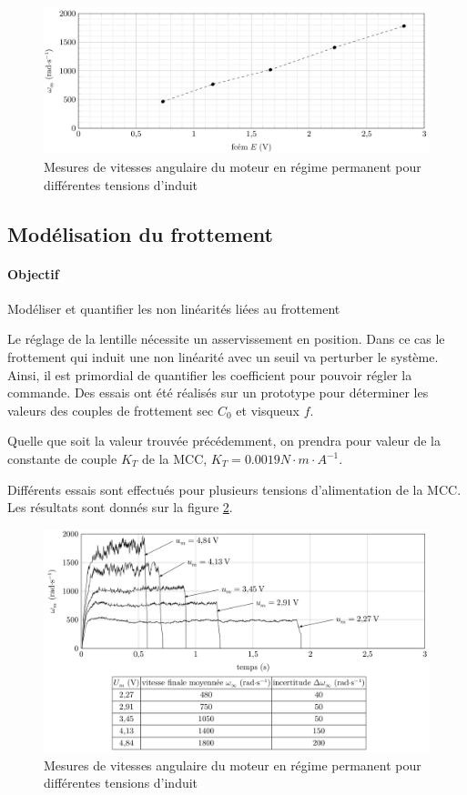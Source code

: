 \begin{figure}[!h]
\centering\includegraphics[width=0.9\linewidth]{img/figure_12}
 \caption{Mesures de vitesses angulaire du moteur en régime permanent pour différentes tensions d'induit}
 \label{img12}
\end{figure}


\subsection{Modélisation du frottement}

\paragraph{Objectif}

Modéliser et quantifier les non linéarités liées au frottement

Le réglage de la lentille nécessite un asservissement en position. Dans ce cas le frottement qui induit une non linéarité avec un seuil va perturber le système. Ainsi, il est primordial de quantifier les coefficient pour pouvoir régler la commande. Des essais ont été réalisés sur un prototype pour déterminer les valeurs des couples de frottement sec $C_0$ et visqueux $f$.

Quelle que soit la valeur trouvée précédemment, on prendra pour valeur de la constante de couple $K_T$ de la MCC, $K_T=0.0019 N\cdot m\cdot A^{-1}$.

Différents essais sont effectués pour plusieurs tensions d'alimentation de la MCC. Les résultats sont donnés sur la figure \ref{img13}.

\begin{figure}[!h]
\centering\includegraphics[width=0.9\linewidth]{img/figure_13}
 \caption{Mesures de vitesses angulaire du moteur en régime permanent pour différentes tensions d'induit}
 \label{img13}
\end{figure}

